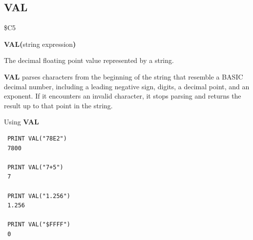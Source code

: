 \subsection{VAL}
\begin{description}[leftmargin=2cm,style=nextline]
\item [Token:] \$C5
\item [Format:] {\bf VAL(}string expression{\bf)}
\item [Returns:] The decimal floating point value represented by a string.

\item [Remarks:] {\bf VAL} parses characters from the beginning of the string
               that resemble a BASIC decimal number, including a leading
               negative sign, digits, a decimal point, and an exponent. If it
               encounters an invalid character, it stops parsing and returns
               the result up to that point in the string.

\item [Example:] Using {\bf VAL}
\begin{tcolorbox}[colback=black,coltext=white]
\verbatimfont{\codefont}
\begin{verbatim}
 PRINT VAL("78E2")
 7800

 PRINT VAL("7+5")
 7

 PRINT VAL("1.256")
 1.256

 PRINT VAL("$FFFF")
 0
\end{verbatim}
\end{tcolorbox}
\end{description}


\newpage
